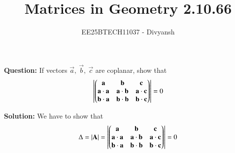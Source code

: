 \documentclass[journal,12pt,onecolumn]{IEEEtran}
\title{Matrices in Geometry 2.10.66}
\author{EE25BTECH11037 - Divyansh}
\theoremstyle{remark}
\begin{document}
\vspace{3cm}
\maketitle
{\let\newpage\relax\maketitle}
\textbf{Question: }
If vectors $\vec{a},\ \vec{b}, \ \vec{c}$ are coplanar, show that
\begin{align*}
\left\vert\begin{pmatrix}
\mathbf{a} & \mathbf{b} & \mathbf{c}\\
\mathbf{a}\cdot \mathbf{a} & \mathbf{a}\cdot \mathbf{b} & \mathbf{a}\cdot \mathbf{c} \\
\mathbf{b}\cdot \mathbf{a} & \mathbf{b}\cdot \mathbf{b} & \mathbf{b}\cdot \mathbf{c} 
\end{pmatrix}\right\vert = 0
\end{align*}
\vspace{2mm}

\textbf{Solution:}
 \vspace{1mm}
We have to show that 
\begin{align}
\Delta=\left\vert\mathbf{A}\right\vert = \left\vert\begin{pmatrix}
\mathbf{a} & \mathbf{b} & \mathbf{c}\\
\mathbf{a}\cdot \mathbf{a} & \mathbf{a}\cdot \mathbf{b} & \mathbf{a}\cdot \mathbf{c} \\
\mathbf{b}\cdot \mathbf{a} & \mathbf{b}\cdot \mathbf{b} & \mathbf{b}\cdot \mathbf{c} 
\end{pmatrix}\right\vert = 0
\end{align}
\end{document}
